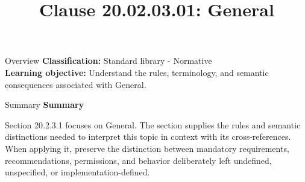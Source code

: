 \documentclass[10pt,letterpaper]{article}
\title{Clause 20.02.03.01: General}
\author{}
\date{}
\begin{document}
\maketitle
\begin{CornellOverviewBox}{Overview}
\textbf{Classification:} Standard library - Normative\\[2pt]
\textbf{Learning objective:} Understand the rules, terminology, and semantic consequences associated with General.
\end{CornellOverviewBox}\begin{CornellSummaryBox}{Summary}
{\sffamily\bfseries\color{Accent} Summary}\par\vspace{3pt}Section 20.2.3.1 focuses on General. The section supplies the rules and semantic distinctions needed to interpret this topic in context with its cross-references. When applying it, preserve the distinction between mandatory requirements, recommendations, permissions, and behavior deliberately left undefined, unspecified, or implementation-defined.
\end{CornellSummaryBox}
\end{document}
